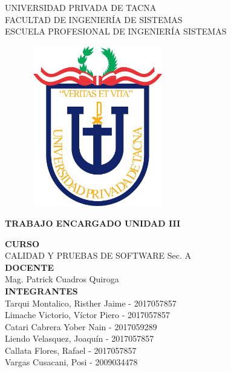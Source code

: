 \documentclass[12pt,a4paper,oneside]{book}
\begin{document}
	
	\thispagestyle{empty} 
	
	\begin{center} 
		\LARGE{UNIVERSIDAD PRIVADA DE TACNA} \\[0.5cm] 
		\Large{FACULTAD DE INGENIERÍA DE SISTEMAS}\\[0.5cm] 
		\large{ ESCUELA PROFESIONAL DE INGENIERÍA SISTEMAS} 
	\end{center}
	
	\begin{figure}[htb]
		\centering \includegraphics[width=6cm, height=7cm]{img/uptlogo.jpg}
	\end{figure}
	
	\begin{center} 
			\LARGE{\bf TRABAJO ENCARGADO \newline UNIDAD III }\\ \vspace{.25cm}
		
	\end{center}

	\begin{center} 
		
		\textbf {CURSO}\\ 
		\large CALIDAD Y PRUEBAS DE SOFTWARE Sec. A \\
		
		\textbf {DOCENTE}\\
		\large Mag. Patrick Cuadros Quiroga\\
	
		\textbf {INTEGRANTES}\\
		\large Tarqui Montalico, Risther Jaime - 2017057857 \\
		\large Limache Victorio, V\'ictor Piero - 2017057857 \\
		\large Catari Cabrera Yober Nain - 2017059289 \\
		\large Liendo Velasquez, Joaqu\'in - 2017057857 \\
		\large Callata Flores, Rafael - 2017057857 \\
		\large Vargas Cusacani, Posi - 2009034478 \\
		
	\end{center}
\end{document}
